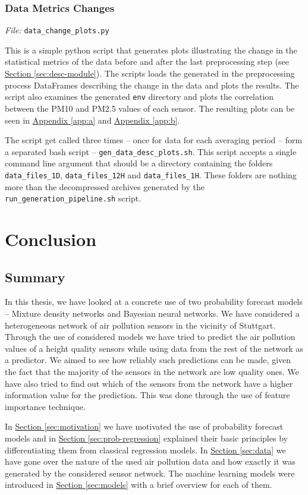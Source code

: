 \documentclass[12pt,a4paper,twoside]{scrartcl}
\numberwithin{equation}{section}
\newcommand{\refsec}[1]{\hyperref[#1]{Section \ref*{#1}}}
\newcommand{\refapp}[1]{\hyperref[#1]{Appendix \ref*{#1}}}
\begin{document}
\subsubsection{Data Metrics Changes}\label{sec:script-data-change}
\noindent\emph{File: }\texttt{data\_change\_plots.py}

This is a simple python script that generates plots illustrating the change in the statistical metrics of the data before and after the last preprocessing step (see \refsec{sec:desc-module}). The scripts loads the generated in the preprocessing process DataFrames describing the change in the data and plots the results. The script also examines the generated \texttt{env} directory and plots the correlation between the PM10 and PM2.5 values of each sensor. The resulting plots can be seen in \refapp{app:a} and \refapp{app:b}.

The script get called three times -- once for data for each averaging period -- form a separated bash script -- \texttt{gen\_data\_desc\_plots.sh}. This script accepts a single command line argument that should be a directory containing the folders \texttt{data\_files\_1D}, \texttt{data\_files\_12H} and \texttt{data\_files\_1H}. These folders are nothing more than the decompressed archives generated by the \texttt{run\_generation\_pipeline.sh} script.
\clearpage
\section{Conclusion}\label{sec:conclusion}
\subsection{Summary}
In this thesis, we have looked at a concrete use of two probability forecast models -- Mixture density networks and Bayesian neural networks. We have considered a heterogeneous network of air pollution sensors in the vicinity of Stuttgart. Through the use of considered models we have tried to predict the air pollution values of a height quality sensors while using data from the rest of the network as a predictor. We aimed to see how reliably such predictions can be made, given the fact that the majority of the sensors in the network are low quality ones. We have also tried to find out which of the sensors from the network have a higher information value for the prediction. This was done through the use of feature importance technique.

In \refsec{sec:motivation} we have motivated the use of probability forecast models and in \refsec{sec:prob-regression} explained their basic principles by differentiating them from classical regression models. In \refsec{sec:data} we have gone over the nature of the used air pollution data and how exactly it was generated by the considered sensor network. The machine learning models were introduced in \refsec{sec:models} with a brief overview for each of them.
\end{document}
